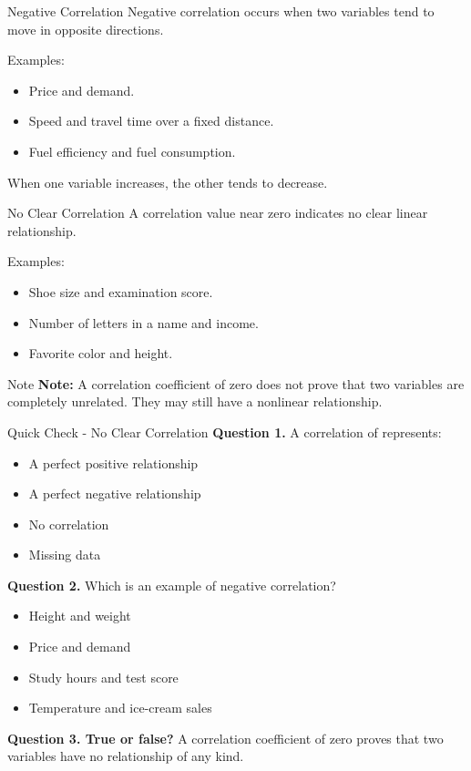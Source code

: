 \documentclass[aspectratio=169,11pt]{beamer}
\begin{document}
\begin{frame}[allowframebreaks]{Negative Correlation}
\small
Negative correlation occurs when two variables tend to move in opposite directions.\par\medskip
Examples:\par\medskip
\begin{itemize}
\item Price and demand.
\item Speed and travel time over a fixed distance.
\item Fuel efficiency and fuel consumption.
\end{itemize}
When one variable increases, the other tends to decrease.\par\medskip
\end{frame}
\begin{frame}[allowframebreaks]{No Clear Correlation}
\small
A correlation value near zero indicates no clear linear relationship.\par\medskip
Examples:\par\medskip
\begin{itemize}
\item Shoe size and examination score.
\item Number of letters in a name and income.
\item Favorite color and height.
\end{itemize}
\begin{block}{Note}
\textbf{Note:} A correlation coefficient of zero does not prove that two variables are completely unrelated. They may still have a nonlinear relationship.
\end{block}
\end{frame}
\begin{frame}[allowframebreaks]{Quick Check - No Clear Correlation}
\footnotesize
\textbf{Question 1.} A correlation of \texttt{} represents:\par\medskip
\begin{itemize}
\item[\textbf{A.}] A perfect positive relationship
\item[\textbf{B.}] A perfect negative relationship
\item[\textbf{C.}] No correlation
\item[\textbf{D.}] Missing data
\end{itemize}
\textbf{Question 2.} Which is an example of negative correlation?\par\medskip
\begin{itemize}
\item[\textbf{A.}] Height and weight
\item[\textbf{B.}] Price and demand
\item[\textbf{C.}] Study hours and test score
\item[\textbf{D.}] Temperature and ice-cream sales
\end{itemize}
\textbf{Question 3. True or false?} A correlation coefficient of zero proves that two variables have no relationship of any kind.\par\medskip
\end{frame}
\end{document}
